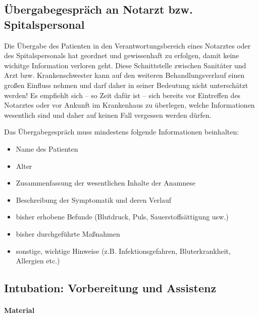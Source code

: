 
\subsection{Übergabegespräch an Notarzt bzw. Spitalspersonal}  

Die Übergabe des Patienten in den Verantwortungsbereich eines Notarztes oder des Spitalspersonals hat geordnet und gewissenhaft zu erfolgen, damit keine wichitge Information verloren geht. Diese Schnittstelle zwischen Sanitäter und Arzt bzw. Krankenschwester kann auf den weiteren Behandlungsverlauf einen großen Einfluss nehmen und darf daher in seiner Bedeutung nicht unterschätzt werden! Es empfiehlt sich -- so Zeit dafür ist -- sich bereits vor Eintreffen des Notarztes oder vor Ankunft im Krankenhaus zu überlegen, welche Informationen wesentlich sind und daher auf keinen Fall vergessen werden dürfen.

Das Übergabegespräch muss mindestens folgende Informationen beinhalten:
\begin{itemize}
    \item Name des Patienten
    \item Alter
    \item Zusammenfassung der wesentlichen Inhalte der Anamnese
    \item Beschreibung der Symptomatik und deren Verlauf
    \item bisher erhobene Befunde (Blutdruck, Puls, Sauerstoffsättigung usw.)
    \item bisher durchgeführte Maßnahmen
    \item sonstige, wichtige Hinweise (z.B. Infektionsgefahren, Bluterkrankheit, Allergien etc.)
\end{itemize}



\subsection{Intubation: Vorbereitung und Assistenz}

\paragraph*{Material}~

